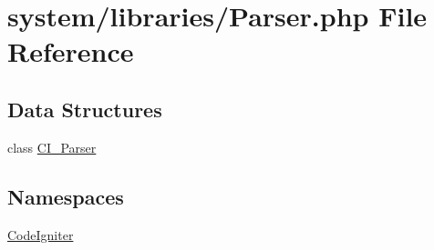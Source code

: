 \hypertarget{_parser_8php}{\section{system/libraries/\-Parser.php File Reference}
\label{_parser_8php}
}
\subsection*{Data Structures}
\begin{DoxyCompactItemize}
\item 
class \hyperlink{class_c_i___parser}{C\-I\-\_\-\-Parser}
\end{DoxyCompactItemize}
\subsection*{Namespaces}
\begin{DoxyCompactItemize}
\item 
\hyperlink{namespace_code_igniter}{Code\-Igniter}
\end{DoxyCompactItemize}
